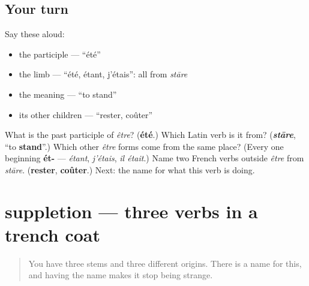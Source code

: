 \subsection*{Your turn}
Say these aloud:

\begin{itemize}
\raggedright
  \item the participle — \textquotedblleft{}été\textquotedblright{}
  \item the limb — \textquotedblleft{}été, étant, j'étais\textquotedblright{}: all from \emph{stāre}
  \item the meaning — \textquotedblleft{}to stand\textquotedblright{}
  \item its other children — \textquotedblleft{}rester, coûter\textquotedblright{}
\end{itemize}

\begin{tcolorbox}[breakable,colback=teal!4,colframe=teal!35!black,title={Before you move on}]
What is the past participle of \emph{être}? (\textbf{été}.) Which Latin verb is it from? (\emph{\textbf{stāre}}, \textquotedblleft{}to \textbf{stand}\textquotedblright{}.) Which other \emph{être} forms come from the same place? (Every one beginning \textbf{ét-} — \emph{étant}, \emph{j'étais}, \emph{il était}.) Name two French verbs outside \emph{être} from \emph{stāre}. (\textbf{rester}, \textbf{coûter}.) Next: the name for what this verb is doing.
\end{tcolorbox}
\section[suppletion]{suppletion — three verbs in a trench coat}

\label{lesson:FR-C16-suppletion}



\begin{quote}
You have three stems and three different origins. There is a name for this, and having the name makes it stop being strange.
\end{quote}

